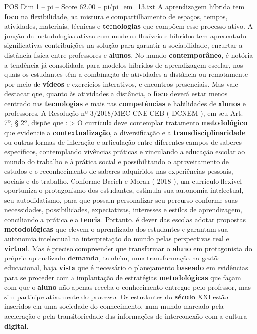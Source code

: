\begin{textsample}{POS Dim 1 – pi – Score 62.00 – pi/pi\_em\_13.txt}
A aprendizagem híbrida tem \textbf{foco} na flexibilidade, na mistura e compartilhamento de espaços, tempos, atividades, materiais, técnicas e \textbf{tecnologias} que compõem esse processo ativo.
A junção de metodologias ativas com modelos flexíveis e híbridos tem apresentado significativas contribuições na solução para garantir a sociabilidade, encurtar a distância física entre professores e \textbf{alunos}.
No mundo \textbf{contemporâneo}, é notória a tendência já consolidada para modelos híbridos de aprendizagem escolar, nos quais os estudantes têm a combinação de atividades a distância ou remotamente por meio de \textbf{vídeos} e exercícios interativos, e encontros presenciais.
Mas vale destacar que, quanto às atividades a distância, o \textbf{foco} deverá estar menos centrado nas \textbf{tecnologias} e mais nas \textbf{competências} e habilidades de \textbf{alunos} e professores.
A Resolução nº 3/2018/MEC-CNE-CEB ( DCNEM ), em seu Art. 7º, § 2º, dispõe que : > O currículo deve contemplar tratamento \textbf{metodológico} que evidencie a \textbf{contextualização}, a diversificação e a \textbf{transdisciplinaridade} ou outras formas de interação e articulação entre diferentes campos de saberes específicos, contemplando vivências práticas e vinculando a educação escolar ao mundo do trabalho e à prática social e possibilitando o aproveitamento de estudos e o reconhecimento de saberes adquiridos nas experiências pessoais, sociais e do trabalho.
Conforme Bacich e Moran ( 2018 ), um currículo flexível oportuniza o protagonismo dos estudantes, estimula sua autonomia intelectual, seu autodidatismo, para que possam personalizar seu percurso conforme suas necessidades, possibilidades, expectativas, interesses e estilos de aprendizagem, conciliando a prática e a \textbf{teoria}.
Portanto, é dever das escolas adotar propostas \textbf{metodológicas} que elevem o aprendizado dos estudantes e garantam sua autonomia intelectual na interpretação do mundo pelas perspectivas real e \textbf{virtual}.
Mas é preciso compreender que transformar o \textbf{aluno} em protagonista do próprio aprendizado \textbf{demanda}, também, uma transformação na gestão educacional, haja \textbf{vista} que é necessário o planejamento \textbf{baseado} em evidências para se proceder com a implantação de estratégias \textbf{metodológicas} que façam com que o \textbf{aluno} não apenas receba o conhecimento entregue pelo professor, mas sim participe ativamente do processo.
Os estudantes do \textbf{século} XXI estão inseridos em uma sociedade do conhecimento, num mundo marcado pela aceleração e pela transitoriedade das informações de interconexão com a cultura \textbf{digital}.

\end{textsample}
